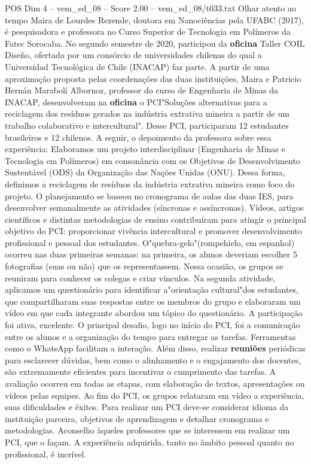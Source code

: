 \begin{textsample}{POS Dim 4 – vem\_ed\_08 – Score 2.00 – vem\_ed\_08/t033.txt}  \label{ex:f4_pos_133}
Olhar atento ao tempo Maira de Lourdes Rezende, doutora em Nanociências pela UFABC (2017), é pesquisadora e professora no Curso Superior de Tecnologia em Polímeros da Fatec Sorocaba.
No segundo semestre de 2020, participou da \textbf{oficina} Taller COIL Diseño, ofertada por um consórcio de universidades chilenas do qual a Universidad Tecnológica de Chile (INACAP) faz parte.
A partir de uma aproximação proposta pelas coordenações das duas instituições, Maira e Patricio Hernán Marabolí Albornoz, professor do curso de Engenharia de Minas da INACAP, desenvolveram na \textbf{oficina} o PCI"Soluções alternativas para a reciclagem dos resíduos gerados na indústria extrativa mineira a partir de um trabalho colaborativo e intercultural".
Desse PCI, participaram 12 estudantes brasileiros e 12 chilenos.
A seguir, o depoimento da professora sobre essa experiência: Elaboramos um projeto interdisciplinar (Engenharia de Minas e Tecnologia em Polímeros) em consonância com os Objetivos de Desenvolvimento Sustentável (ODS) da Organização das Nações Unidas (ONU).
Dessa forma, definimos a reciclagem de resíduos da indústria extrativa mineira como foco do projeto.
O planejamento se baseou no cronograma de aulas das duas IES, para desenvolver semanalmente as atividades (síncronas e assíncronas).
Vídeos, artigos científicos e distintas metodologias de ensino contribuíram para atingir o principal objetivo do PCI: proporcionar vivência intercultural e promover desenvolvimento profissional e pessoal dos estudantes.
O"quebra-gelo"(rompehielo, em espanhol) ocorreu nas duas primeiras semanas: na primeira, os alunos deveriam escolher 5 fotografias (suas ou não) que os representassem.
Nessa ocasião, os grupos se reuniram para conhecer os colegas e criar vínculos.
Na segunda atividade, aplicamos um questionário para identificar a"orientação cultural"dos estudantes, que compartilharam suas respostas entre os membros do grupo e elaboraram um vídeo em que cada integrante abordou um tópico do questionário.
A participação foi ativa, excelente.
O principal desafio, logo no início do PCI, foi a comunicação entre os alunos e a organização do tempo para entregar as tarefas.
Ferramentas como o WhatsApp facilitam a interação.
Além disso, realizar \textbf{reuniões} periódicas para esclarecer dúvidas, bem como o alinhamento e o engajamento dos docentes, são extremamente eficientes para incentivar o cumprimento das tarefas.
A avaliação ocorreu em todas as etapas, com elaboração de textos, apresentações ou vídeos pelas equipes.
Ao fim do PCI, os grupos relataram em vídeo a experiência, suas dificuldades e êxitos.
Para realizar um PCI deve-se considerar idioma da instituição parceira, objetivos de aprendizagem e detalhar cronograma e metodologias.
Aconselho àqueles professores que se interessem em realizar um PCI, que o façam.
A experiência adquirida, tanto no âmbito pessoal quanto no profissional, é incrível.

\end{textsample}

